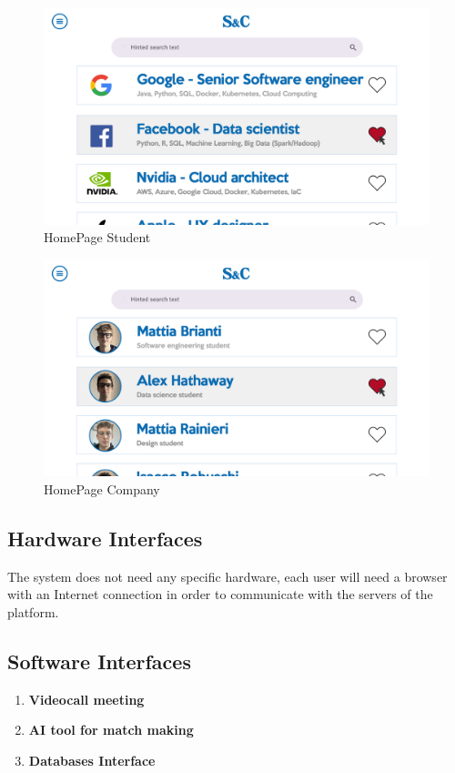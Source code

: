\begin{figure}[H]
      \centering
      \includegraphics[width=\textwidth]{RASD/Assets/User interfaces/Homepage_student.png}
      \caption{HomePage Student}
      \label{fig:HomePage Student}
\end{figure}
\begin{figure}[H]
      \centering
      \includegraphics[width=\textwidth]{RASD/Assets/User interfaces/Homepage Company.png}
      \caption{HomePage Company}
      \label{fig:HomePage Company}
\end{figure}


\subsection{Hardware Interfaces}
The system does not need any specific hardware, each user will need a browser with an Internet connection in order to communicate with the servers of the platform.

\subsection{Software Interfaces}
\begin{enumerate}
    \item \textbf{Videocall meeting}
    \item \textbf{AI tool for match making}
    \item \textbf{Databases Interface}
\end{enumerate}

